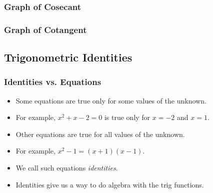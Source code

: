 \documentclass[serif,ignorenonframetext]{beamer}
\begin{document}
\begin{frame}
  \frametitle{Graph of Cosecant}
\end{frame}

\begin{frame}
  \frametitle{Graph of Cotangent}
\end{frame}


\subsection{Trigonometric Identities}


\begin{frame}
  \frametitle{Identities vs. Equations}
  \begin{itemize}[<+->]
  \item Some equations are true only for some values of the unknown.
  \item For example, $x^2+x-2=0$ is true only for $x=-2$ and $x=1$.
  \item Other equations are true for all values of the unknown.
  \item For example, $x^2-1=(x+1)(x-1)$.
  \item We call such equations \textit{identities}.
  \item Identities give us a way to do algebra with the trig functions.
  \end{itemize}
\end{frame}
\end{document}
